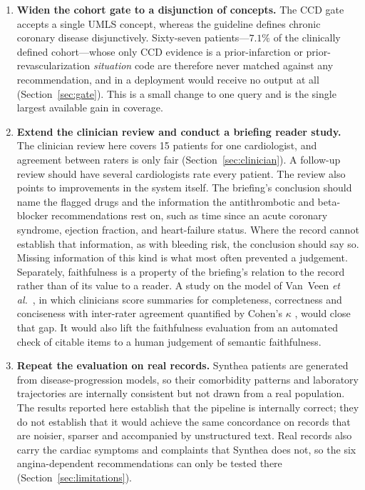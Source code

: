 \begin{enumerate}
    \item \textbf{Widen the cohort gate to a disjunction of concepts.} The CCD gate accepts
    a single UMLS concept, whereas the guideline defines chronic coronary disease
    disjunctively. Sixty-seven patients---$7.1\%$ of the clinically defined
    cohort---whose only CCD evidence is a prior-infarction or prior-revascularization
    \emph{situation} code are therefore never matched against any recommendation, and in a
    deployment would receive no output at all (Section~\ref{sec:gate}). This is a small
    change to one query and is the single largest available gain in coverage.

    \item \textbf{Extend the clinician review and conduct a briefing reader study.} The
    clinician review here covers 15 patients for one cardiologist, and agreement between
    raters is only fair (Section~\ref{sec:clinician}). A follow-up review should have several
    cardiologists rate every patient. The review also points to improvements in the system
    itself. The briefing's conclusion should name the flagged drugs and the information the
    antithrombotic and beta-blocker recommendations rest on, such as time since an acute
    coronary syndrome, ejection fraction, and heart-failure status. Where the record cannot
    establish that information, as with bleeding risk, the conclusion should say so. Missing
    information of this kind is what most often prevented a judgement. Separately,
    faithfulness is a property of the briefing's relation to the record rather than of its
    value to a reader. A study on the model of Van~Veen \textit{et al.}~\cite{vanveen2023}, in
    which clinicians score summaries for completeness, correctness and conciseness with
    inter-rater agreement quantified by Cohen's $\kappa$ \cite{cohen1960}, would close that
    gap. It would also lift the faithfulness evaluation from an automated check of citable
    items to a human judgement of semantic faithfulness.

    \item \textbf{Repeat the evaluation on real records.} Synthea patients are generated
    from disease-progression models, so their comorbidity patterns and laboratory
    trajectories are internally consistent but not drawn from a real population. The results
    reported here establish that the pipeline is internally correct; they do not establish
    that it would achieve the same concordance on records that are noisier, sparser and
    accompanied by unstructured text. Real records also carry the cardiac symptoms and
    complaints that Synthea does not, so the six angina-dependent recommendations can only be
    tested there (Section~\ref{sec:limitations}).


\end{enumerate}
